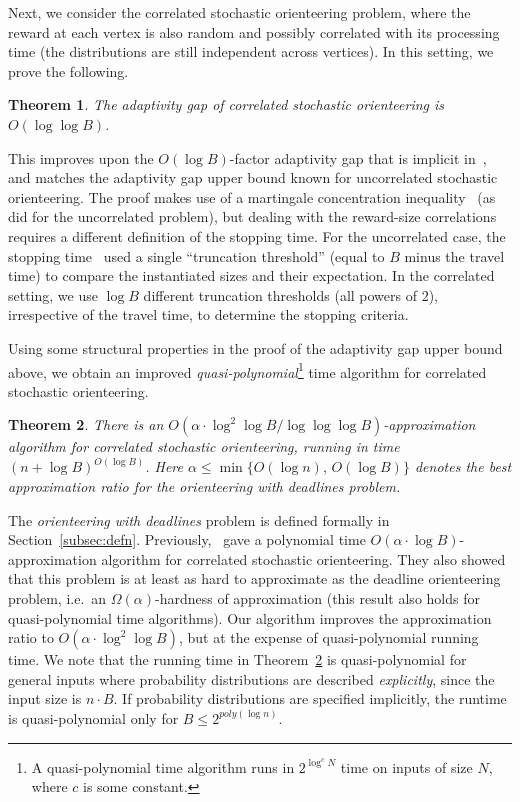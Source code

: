 \documentclass[11pt,letterpaper]{article}
\newtheorem{theorem}{Theorem}[section]
\numberwithin{algorithm}{section}
\begin{document}
Next, we consider the correlated stochastic orienteering problem, where the reward at each vertex is also random and possibly correlated with its processing time (the distributions are still independent across vertices). In this setting, we prove the following.\begin{theorem}\label{thm:corr-loglog-UB}
The adaptivity gap of correlated stochastic orienteering is $O(\log\log B)$.
\end{theorem}
 This improves upon the $O(\log B)$-factor adaptivity gap that is implicit in~\cite{GKNR12}, and matches the adaptivity gap upper bound known for uncorrelated stochastic orienteering. The  proof makes use of a martingale concentration inequality~\cite{Zhang05} (as~\cite{GKNR12} did for the uncorrelated problem), but dealing with the reward-size correlations requires a different definition of the stopping time. For the uncorrelated case, the stopping time~\cite{GKNR12} used a single ``truncation threshold'' (equal to $B$ minus the travel time)  to compare the instantiated sizes and their expectation.
In the correlated setting, we use $\log B$ different
truncation thresholds (all powers of $2$), irrespective of the travel time, to determine the stopping criteria.




\medskip

Using some structural properties in the proof of the adaptivity gap upper bound above, we obtain an improved {\em quasi-polynomial}\footnote{A quasi-polynomial time algorithm runs in $2^{\log^c N}$ time on inputs of size $N$, where $c$ is some constant.} time algorithm for correlated stochastic orienteering.
\begin{theorem}\label{thm:corr-NA}
There is an $O\left( \alpha\cdot \log^2\log B/\log\log\log B\right)$-approximation algorithm for correlated stochastic orienteering, running in time $(n+\log B)^{O(\log B)}$. Here $\alpha\le \min\{O(\log n),\, O(\log B)\}$ denotes the best approximation ratio for the orienteering with deadlines problem.
\end{theorem}
The {\em orienteering with deadlines} problem is defined formally in Section~\ref{subsec:defn}.
Previously,~\cite{GKNR12} gave a  polynomial time $O(\alpha\cdot \log B)$-approximation algorithm for correlated stochastic orienteering. They also showed that this problem is at least as hard to approximate as the deadline orienteering problem, i.e.~an $\Omega(\alpha)$-hardness of approximation (this result also holds for quasi-polynomial time algorithms). Our algorithm improves the approximation ratio to $O(\alpha\cdot \log^2\log B)$, but at the expense of quasi-polynomial running time. We note that the running time in Theorem~\ref{thm:corr-NA} is quasi-polynomial for general inputs where probability distributions are described {\em explicitly}, since the input size is $n\cdot B$. If probability distributions are specified implicitly, the runtime is quasi-polynomial only for $B\le 2^{poly(\log n)}$.
\end{document}

